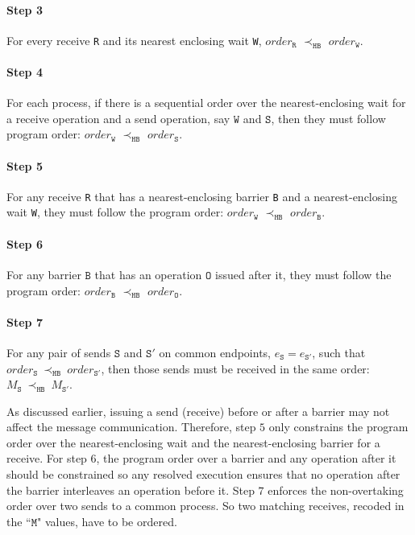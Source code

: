 \paragraph*{Step 3} For every receive \texttt{R} and its nearest
enclosing wait \texttt{W}, $\mathit{order}_\mathtt{R}$
$\prec_\mathtt{HB}$ $\mathit{order}_\mathtt{W}$.

\paragraph*{Step 4} For each process, if there is a sequential order over the nearest-enclosing wait for a receive operation and a send operation, say $\mathtt{W}$ and $\mathtt{S}$, then they must follow program order: $\mathit{order}_\mathtt{W}$
$\prec_\mathtt{HB}$ $\mathit{order}_\mathtt{S}$.

\paragraph*{Step 5} For any receive \texttt{R} that has a nearest-enclosing barrier \texttt{B} and a nearest-enclosing wait \texttt{W}, they must follow the program order:
$\mathit{order}_\mathtt{W}$ $\prec_\mathtt{HB}$ $\mathit{order}_\mathtt{B}$.

\paragraph*{Step 6} For any barrier $\mathtt{B}$ that has an operation $\mathtt{O}$ issued after it, they must follow the program order: $\mathit{order}_\mathtt{B}$
$\prec_\mathtt{HB}$ $\mathit{order}_\mathtt{O}$.

\paragraph*{Step 7} For any pair of sends $\mathtt{S}$ and
$\mathtt{S'}$ on common endpoints, $e_{\mathtt{S}}=e_{\mathtt{S'}}$,
such that
$\mathit{order}_\mathtt{S}\ \mathrm{\prec_\mathtt{HB}}\ \mathit{order}_\mathtt{S'}$,
then those sends must be received in the same order:
$M_{\mathtt{S}}\ \mathrm{\prec_{\mathtt{HB}}}\ M_{\mathtt{S'}}$.

As discussed earlier, issuing a send (receive) before or after a barrier may not affect the message communication. Therefore, step $5$ only constrains the program order over the nearest-enclosing wait and the nearest-enclosing barrier for a receive. For step $6$, the program order over a barrier and any operation after it should be constrained so any resolved execution ensures that no operation after the barrier interleaves an operation before it. Step $7$ enforces the non-overtaking order over two sends to a common process. So two matching receives, recoded in the ``$\mathtt{M}$" values, have to be ordered.

